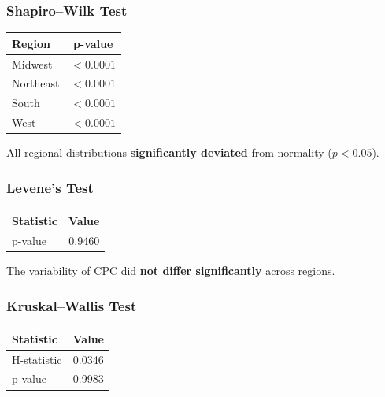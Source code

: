 \subsubsection{Shapiro--Wilk Test}

\begin{table}[H]
	\centering
	\begin{tabular}{lc}
		\toprule
		Region & p-value \\
		\midrule
		Midwest & $<0.0001$ \\
		Northeast & $<0.0001$ \\
		South & $<0.0001$ \\
		West & $<0.0001$ \\
		\bottomrule
	\end{tabular}
\end{table}

All regional distributions \textbf{significantly deviated} from normality ($p<0.05$).

\vspace{0.3cm}

\subsubsection{Levene's Test}

\begin{table}[H]
	\centering
	\begin{tabular}{lc}
		\toprule
		Statistic & Value \\
		\midrule
		p-value & 0.9460 \\
		\bottomrule
	\end{tabular}
\end{table}

The variability of CPC did \textbf{not differ significantly} across regions.

\vspace{0.3cm}

\subsubsection{Kruskal--Wallis Test}

\begin{table}[H]
	\centering
	\begin{tabular}{lc}
		\toprule
		Statistic & Value \\
		\midrule
		H-statistic & 0.0346 \\
		p-value & 0.9983 \\
		\bottomrule
	\end{tabular}
\end{table}

